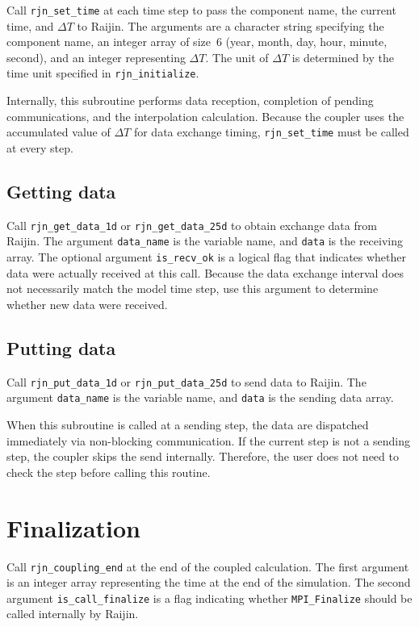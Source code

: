 \documentclass[11pt,a4paper]{report}
\begin{document}
Call \texttt{rjn\_set\_time} at each time step
to pass the component name,
the current time, and $\Delta T$ to Raijin.
The arguments are a character string
specifying the component name,
an integer array of size~6
(year, month, day, hour, minute, second),
and an integer representing $\Delta T$.
The unit of $\Delta T$ is determined
by the time unit specified
in \texttt{rjn\_initialize}.

Internally, this subroutine performs
data reception, completion of pending communications,
and the interpolation calculation.
Because the coupler uses the accumulated value of $\Delta T$
for data exchange timing,
\texttt{rjn\_set\_time} must be called at every step.

\subsection{Getting data}

Call \texttt{rjn\_get\_data\_1d} or
\texttt{rjn\_get\_data\_25d} to obtain exchange data
from Raijin.
The argument \texttt{data\_name} is the variable name,
and \texttt{data} is the receiving array.
The optional argument \texttt{is\_recv\_ok}
is a logical flag that indicates
whether data were actually received at this call.
Because the data exchange interval
does not necessarily match the model time step,
use this argument to determine
whether new data were received.

\subsection{Putting data}

Call \texttt{rjn\_put\_data\_1d} or
\texttt{rjn\_put\_data\_25d} to send data to Raijin.
The argument \texttt{data\_name} is the variable name,
and \texttt{data} is the sending data array.

When this subroutine is called at a sending step,
the data are dispatched immediately
via non-blocking communication.
If the current step is not a sending step,
the coupler skips the send internally.
Therefore, the user does not need to check
the step before calling this routine.

\section{Finalization}

Call \texttt{rjn\_coupling\_end} at the end of the coupled calculation.
The first argument is an integer array
representing the time at the end of the simulation.
The second argument \texttt{is\_call\_finalize} is a flag
indicating whether \texttt{MPI\_Finalize}
should be called internally by Raijin.
\end{document}
